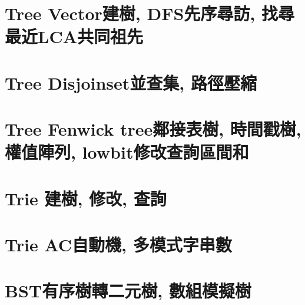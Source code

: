 \documentclass{article}
\begin{document}
\footnotesize \tableofcontents  %
\newpage  %
\begin{multicols}{2}%

\section{Tree Vector建樹, DFS先序尋訪, 找尋最近LCA共同祖先}



\section{Tree Disjoinset並查集, 路徑壓縮}



\section{Tree Fenwick tree鄰接表樹, 時間戳樹, 權值陣列, lowbit修改查詢區間和}



\section{Trie 建樹, 修改, 查詢}



\section{Trie AC自動機, 多模式字串數}



\section{BST有序樹轉二元樹, 數組模擬樹}




\end{multicols}
\end{document}
